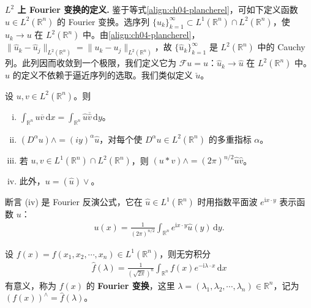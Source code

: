 \documentclass[../../main.tex]{subfiles}
\begin{document}
\textbf{$L^2$ 上 Fourier 变换的定义.} 鉴于等式\eqref{align:ch04-plancherel}，可如下定义函数 $u\in L^2(\mathbb{R}^n)$ 的 Fourier 变换。选序列 $\{u_k\}_{k=1}^\infty\subset L^1(\mathbb{R}^n)\cap L^2(\mathbb{R}^n)$，使 $u_k\to u$ 在 $L^2(\mathbb{R}^n)$ 中。由\eqref{align:ch04-plancherel}，$\|\widehat{u}_k-\widehat{u}_j\|_{L^2(\mathbb{R}^n)}=\|u_k-u_j\|_{L^2(\mathbb{R}^n)}$，故 $\{\widehat{u}_k\}_{k=1}^\infty$ 是 $L^2(\mathbb{R}^n)$ 中的 Cauchy 列。此列因而收敛到一个极限，我们定义它为 $\mathcal{F}u=\widehat{u}$：$\widehat{u}_k\to\widehat{u}$ 在 $L^2(\mathbb{R}^n)$ 中。$\widehat{u}$ 的定义不依赖于逼近序列的选取。我们类似定义 $\check{u}$。

\begin{theorem}[Fourier变换的性质]\label{theorem:1222-Fourier变换的性质}
设 $u,v\in L^2(\mathbb{R}^n)$。则
\begin{enumerate}[(i)]
\item\label{theorem:1222-Fourier变换的性质-1} $\int_{\mathbb{R}^n}u\overline{v}\,\mathrm{d}x=\int_{\mathbb{R}^n}\widehat{u}\overline{\widehat{v}}\,\mathrm{d}y$。
\item\label{theorem:1222-Fourier变换的性质-2} $(D^\alpha u)\wedge=(iy)^\alpha\widehat{u}$，对每个使 $D^\alpha u\in L^2(\mathbb{R}^n)$ 的多重指标 $\alpha$。
\item 若 $u,v\in L^1(\mathbb{R}^n)\cap L^2(\mathbb{R}^n)$，则 $(u*v)\wedge=(2\pi)^{n/2}\widehat{u}\widehat{v}$。
\item 此外，$u=(\widehat{u})\vee$。
\end{enumerate}
\end{theorem}

断言 (iv) 是 Fourier 反演公式，它在 $\widehat{u}\in L^1(\mathbb{R}^n)$ 时用指数平面波 $e^{\mathrm{i}x\cdot y}$ 表示函数 $u$：
\begin{align}\label{align:ch05-Fourier导数}
u(x)=\frac{1}{(2\pi)^{n/2}}\int_{\mathbb{R}^n}e^{\mathrm{i}x\cdot y}\widehat{u}(y)\,\mathrm{d}y.
\end{align}


\begin{definition}
设 $f(x)=f(x_1,x_2,\cdots,x_n)\in L^1(\mathbb{R}^n)$，则无穷积分
\begin{align}
\hat{f}(\lambda)=\frac{1}{(\sqrt{2\pi})^n}\int_{\mathbb{R}^n}f(x)e^{-\mathrm{i}\lambda \cdot x}\,\mathrm{d}x \label{eq:fourier-multidim}
\end{align}
有意义，称为 $f(x)$ 的 \textbf{Fourier 变换}，这里 $\lambda=(\lambda_1,\lambda_2,\cdots,\lambda_n)\in\mathbb{R}^n$，记为 $(f(x))^\wedge=\hat{f}(\lambda)$。
\end{definition}
\end{document}
